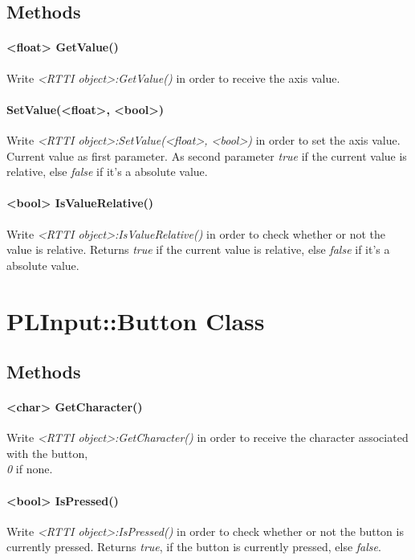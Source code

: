 \subsection{Methods}

\paragraph{<float> GetValue()}
Write \emph{<RTTI object>:GetValue()} in order to receive the axis value.

\paragraph{SetValue(<float>, <bool>)}
Write \emph{<RTTI object>:SetValue(<float>, <bool>)} in order to set the axis value. Current value as first parameter. As second parameter \emph{true} if the current value is relative, else \emph{false} if it's a absolute value.

\paragraph{<bool> IsValueRelative()}
Write \emph{<RTTI object>:IsValueRelative()} in order to check whether or not the value is relative. Returns \emph{true} if the current value is relative, else \emph{false} if it's a absolute value.




\section{PLInput::Button Class}


\subsection{Methods}

\paragraph{<char> GetCharacter()}
Write \emph{<RTTI object>:GetCharacter()} in order to receive the character associated with the button, \emph{\\0} if none.

\paragraph{<bool> IsPressed()}
Write \emph{<RTTI object>:IsPressed()} in order to check whether or not the button is currently pressed. Returns \emph{true}, if the button is currently pressed, else \emph{false}.

